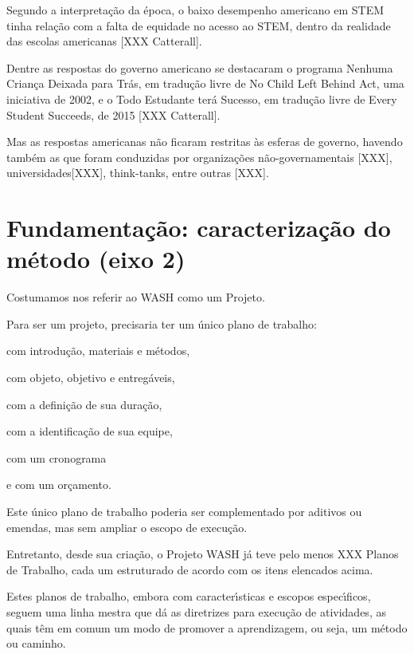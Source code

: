 \documentclass[
12pt,		%
openright,	%
twoside,  %
a4paper,			%
chapter=TITLE,		%
english,			%
french,				%
spanish,			%
brazil				%
]{USPSC-classe/USPSC}
\begin{document}
Segundo a interpreta\c{c}\~ao da \'epoca, o baixo desempenho americano em STEM tinha rela\c{c}\~ao com a falta de equidade no acesso ao STEM, dentro da realidade das escolas americanas [XXX Catterall].


Dentre as respostas do governo americano se destacaram o programa \textquotedbl Nenhuma Crian\c{c}a Deixada para Tr\'as, em tradu\c{c}\~ao livre de \textquotedbl No Child Left Behind Act, uma iniciativa de 2002, e o \textquotedbl Todo Estudante ter\'a Sucesso, em tradu\c{c}\~ao livre de \textquotedbl Every Student Succeeds, de 2015 [XXX Catterall].


Mas as respostas americanas n\~ao ficaram restritas \`as esferas de governo, havendo tamb\'em as que foram conduzidas por organiza\c{c}\~oes n\~ao-governamentais [XXX], universidades[XXX], think-tanks, entre outras [XXX].


\section[Fundamenta\c{c}\~ao: caracteriza\c{c}\~ao do m\'etodo (eixo 2)]{Fundamenta\c{c}\~ao: caracteriza\c{c}\~ao do m\'etodo (eixo 2)}\label{Fundamenta\c{c}\~ao: caracteriza\c{c}\~ao do m\'etodo (eixo 2)}
Costumamos nos referir ao WASH como um Projeto.


Para ser um projeto, precisaria ter um \'unico plano de trabalho:



\begin{alineas}
\item com introdu\c{c}\~ao, materiais e m\'etodos,
\item com objeto, objetivo e entreg\'aveis,
\item com a defini\c{c}\~ao de sua dura\c{c}\~ao,
\item com a identifica\c{c}\~ao de sua equipe,
\item com um cronograma
\item e com um or\c{c}amento.
\end{alineas}

Este \'unico plano de trabalho poderia ser complementado por aditivos ou emendas, mas sem ampliar o escopo de execu\c{c}\~ao.


Entretanto, desde sua cria\c{c}\~ao, o Projeto WASH j\'a teve pelo menos XXX Planos de Trabalho, cada um estruturado de acordo com os itens elencados acima.


Estes planos de trabalho, embora com caracter\'{\i}sticas e escopos espec\'{\i}ficos, seguem uma linha mestra que d\'a as diretrizes para execu\c{c}\~ao de atividades, as quais t\^em em comum um modo de promover a aprendizagem, ou seja, um m\'etodo ou \textquotedbl caminho\textquotedbl .
\end{document}

